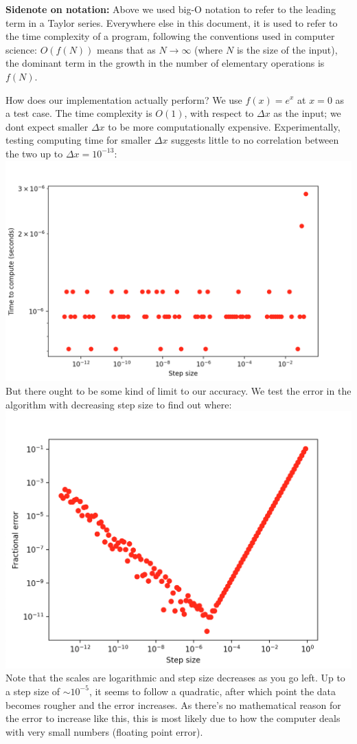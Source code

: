 \documentclass[11pt]{article}
\theoremstyle{plain}
\begin{document}
\textbf{Sidenote on notation:} Above we used big-O notation to refer to the leading term in a Taylor series. Everywhere else in this document, it is used to refer to the time complexity of a program, following the conventions used in computer science: $O(f(N))$ means that as $N\to\infty$ (where $N$ is the size of the input), the dominant term in the growth in the number of elementary operations is $f(N)$.
\par
How does our implementation actually perform? We use $f(x)=e^x$ at $x=0$ as a test case. The time complexity is $O(1)$, with respect to $\Delta x$ as the input; we dont expect smaller $\Delta x$ to be more computationally expensive. Experimentally, testing computing time for smaller $\Delta x$ suggests little to no correlation between the two up to $\Delta x = 10^{-13}$: \\
\includegraphics[scale=0.5]{finitedifftime}
\\ But there ought to be some kind of limit to our accuracy. We test the error in the algorithm with decreasing step size to find out where: \\
\includegraphics[scale=0.5]{finitediff}
\\ Note that the scales are logarithmic and step size decreases as you go left. Up to a step size of $\sim 10^{-5}$, it seems to follow a quadratic, after which point the data becomes rougher and the error increases. As there's no mathematical reason for the error to increase like this, this is most likely due to how the computer deals with very small numbers (floating point error). 
\end{document}
